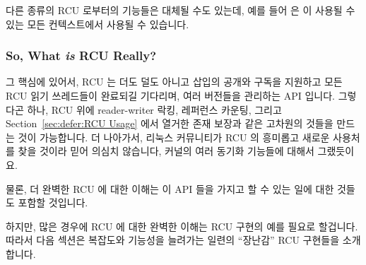 다른 종류의 RCU 로부터의 기능들은 대체될 수도 있는데, 예를 들어
 은  이 사용될 수 있는 모든
컨텍스트에서 사용될 수 있습니다.
\iffalse

Figure~\ref{fig:defer:RCU API Usage Constraints}
shows which APIs may be used in which in-kernel environments.
The RCU read-side primitives may be used in any environment, including NMI,
the RCU mutation and asynchronous grace-period primitives may be used in any
environment other than NMI, and, finally, the RCU synchronous grace-period
primitives may be used only in process context.
The RCU list-traversal primitives include \co{list_for_each_entry_rcu()},
\co{hlist_for_each_entry_rcu()}, etc.
Similarly, the RCU list-mutation primitives include
\co{list_add_rcu()}, \co{hlist_del_rcu()}, etc.

Note that primitives from other families of RCU may be substituted,
for example, \co{srcu_read_lock()} may be used in any context
in which \co{rcu_read_lock()} may be used.
\fi

\subsubsection{So, What \emph{is} RCU Really?}
\label{sec:defer:So, What is RCU Really?}

그 핵심에 있어서, RCU 는 더도 덜도 아니고 삽입의 공개와 구독을 지원하고 모든
RCU 읽기 쓰레드들이 완료되길 기다리며, 여러 버전들을 관리하는 API 입니다.
그렇다곤 하나, RCU 위에 reader-writer 락킹, 레퍼런스 카운팅, 그리고
Section~\ref{sec:defer:RCU Usage} 에서 열거한 존재 보장과 같은 고차원의 것들을
만드는 것이 가능합니다.
더 나아가서, 리눅스 커뮤니티가 RCU 의 흥미롭고 새로운 사용처를 찾을 것이라 믿어
의심치 않습니다, 커널의 여러 동기화 기능들에 대해서 그랬듯이요.

물론, 더 완벽한 RCU 에 대한 이해는 이 API 들을 가지고 할 수 있는 일에 대한
것들도 포함할 것입니다.

하지만, 많은 경우에 RCU 에 대한 완벽한 이해는 RCU 구현의 예를 필요로 할겁니다.
따라서 다음 섹션은 복잡도와 기능성을 늘려가는 일련의 ``장난감'' RCU 구현들을
소개합니다.
\iffalse

At its core, RCU is nothing more nor less than an API that supports
publication and subscription for insertions, waiting for all RCU readers
to complete, and maintenance of multiple versions.
That said, it is possible to build higher-level constructs
on top of RCU, including the reader-writer-locking, reference-counting,
and existence-guarantee constructs listed in
Section~\ref{sec:defer:RCU Usage}.
Furthermore, I have no doubt that the Linux community will continue to
find interesting new uses for RCU,
just as they do for any of a number of synchronization
primitives throughout the kernel.

Of course, a more-complete view of RCU would also include
all of the things you can do with these APIs.

However, for many people, a complete view of RCU must include sample
RCU implementations.
The next section therefore presents a series of ``toy'' RCU implementations
of increasing complexity and capability.
\fi
